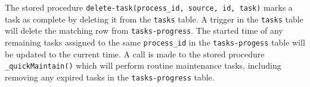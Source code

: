 \documentclass[
]{book}
\begin{document}
The stored procedure \texttt{delete-task(process\_id,\ source,\ id,\ task)} marks a task as complete by deleting it from the \texttt{tasks} table. A trigger in the \texttt{tasks} table will delete the matching row from \texttt{tasks-progress}. The started time of any remaining tasks assigned to the same \texttt{process\_id} in the \texttt{tasks-progess} table will be updated to the current time. A call is made to the stored procedure \texttt{\_quickMaintain()} which will perform routine maintenance tasks, including removing any expired tasks in the \texttt{tasks-progress} table.

  
\end{document}
